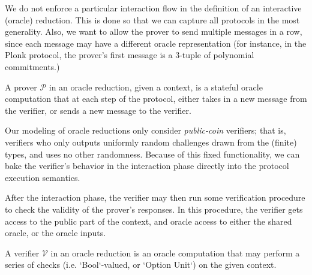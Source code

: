 \begin{remark}
    We do not enforce a particular interaction flow in the definition of an interactive (oracle) reduction. This is done so that we can capture all protocols in the most generality. Also, we want to allow the prover to send multiple messages in a row, since each message may have a different oracle representation (for instance, in the Plonk protocol, the prover's first message is a 3-tuple of polynomial commitments.)
\end{remark}

\begin{definition}
    \label{def:prover_type_signature}
    A prover $\mathcal{P}$ in an oracle reduction, given a context, is a stateful oracle computation
    that at each step of the protocol, either takes in a new message from the verifier, or sends a
    new message to the verifier.
\end{definition}

Our modeling of oracle reductions only consider \emph{public-coin} verifiers; that is, verifiers who
only outputs uniformly random challenges drawn from the (finite) types, and uses no other
randomness. Because of this fixed functionality, we can bake the verifier's behavior in the
interaction phase directly into the protocol execution semantics.

After the interaction phase, the verifier may then run some verification procedure to check the
validity of the prover's responses. In this procedure, the verifier gets access to the public part
of the context, and oracle access to either the shared oracle, or the oracle inputs.

\begin{definition}
    \label{def:verifier_type_signature}
    A verifier $\mathcal{V}$ in an oracle reduction is an oracle computation that may perform a
    series of checks (i.e. `Bool`-valued, or `Option Unit`) on the given context.
\end{definition}


